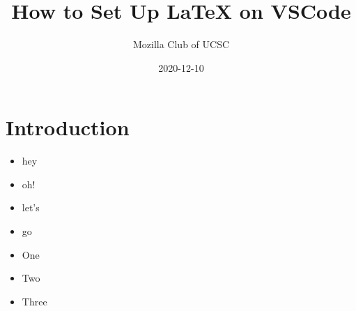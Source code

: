 \documentclass[12pt]{article}
\title{How to Set Up LaTeX on VSCode}
\author{Mozilla Club of UCSC}
\date{2020-12-10} %
\begin{document}
\maketitle

\section{Introduction}



\begin{itemize}
    \item hey
    \item oh!
    \item let's
    \item go
    \item One
    \item Two
    \item Three
\end{itemize}
\end{document}
